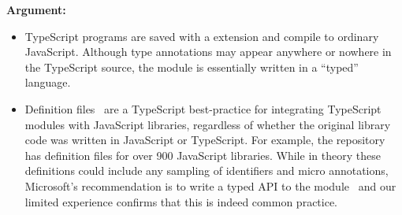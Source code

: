 \documentclass{article}
\begin{document}
\textbf{Argument:}
\begin{itemize}
\item
  TypeScript programs are saved with a  extension and compile to ordinary JavaScript.
  Although type annotations may appear anywhere or nowhere in the TypeScript source, the module is essentially written in a ``typed'' language.
\item
  Definition files~\cite{todo} are a TypeScript best-practice for integrating TypeScript modules with JavaScript libraries, regardless of whether the original library code was written in JavaScript or TypeScript.
  For example, the  repository~\cite{todo} has definition files for over 900 JavaScript libraries.
  While in theory these definitions could include any sampling of identifiers and micro annotations, Microsoft's recommendation is to write a typed API to the module~\cite{todo} and our limited experience confirms that this is indeed common practice.
\end{itemize}

\vfill


\end{document}
